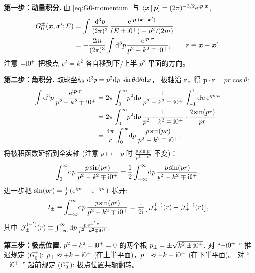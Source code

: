 \begin{proof*}
\textbf{第一步：动量积分.}
由 \eqref{eq:G0-momentum} 与 $\left\langle \bm x \,\middle|\, \bm p \right\rangle=(2\pi)^{-3/2}\mathrm{e}^{\mathrm{i}\bm p\cdot\bm x}$,
\begin{align}
  G_0^\pm(\bm x,\bm x';E)
  &= \int\frac{\mathrm{d}^3 p}{(2\pi)^3}\,
     \frac{\mathrm{e}^{\mathrm{i}\bm p\cdot(\bm x-\bm x')}}{(E\pm\mathrm{i} 0^+)-p^2/(2m)}\notag\\
  &= -\frac{2m}{(2\pi)^3}\int\mathrm{d}^3 p\,
     \frac{\mathrm{e}^{\mathrm{i}\bm p\cdot\bm r}}{p^2 - k^2\mp\mathrm{i} 0^+},\qquad
  \bm r\equiv\bm x-\bm x'.\label{eq:G-free-3d-step1}
\end{align}
注意 $\mp\mathrm{i} 0^+$ 把极点 $p^2=k^2$ 各自移到下/上半 $p^2$-平面的方向。

\textbf{第二步：角积分.}
取球坐标 $\mathrm{d}^3 p=p^2\mathrm{d} p\,\sin\theta\mathrm{d}\theta\mathrm{d}\varphi$，
极轴沿 $\bm r$，得 $\bm p\cdot\bm r=pr\cos\theta$:
\begin{align}
  \int\mathrm{d}^3 p\,\frac{\mathrm{e}^{\mathrm{i}\bm p\cdot\bm r}}{p^2-k^2\mp\mathrm{i} 0^+}
  &= 2\pi\int_0^\infty\!p^2\mathrm{d} p\,
     \frac{1}{p^2-k^2\mp\mathrm{i} 0^+}
     \int_{-1}^{1}\mathrm{d} u\,\mathrm{e}^{\mathrm{i} pru}\notag\\
  &= 2\pi\int_0^\infty\!p^2\mathrm{d} p\,
     \frac{1}{p^2-k^2\mp\mathrm{i} 0^+}\cdot
     \frac{2\sin(pr)}{pr}\notag\\
  &= \frac{4\pi}{r}\int_0^\infty\!\mathrm{d} p\,
     \frac{p\sin(pr)}{p^2-k^2\mp\mathrm{i} 0^+}.
\end{align}
将被积函数延拓到全实轴 (注意 $p\mapsto -p$ 时 $\frac{p\sin pr}{p^2-k^2}$ 不变)：
\begin{equation}
  \int_0^\infty\!\mathrm{d} p\,\frac{p\sin(pr)}{p^2-k^2\mp\mathrm{i} 0^+}
  = \frac12\int_{-\infty}^{\infty}\!\mathrm{d} p\,\frac{p\sin(pr)}{p^2-k^2\mp\mathrm{i} 0^+}.
\end{equation}
进一步把 $\sin(pr)=\frac{1}{2\mathrm{i}}(\mathrm{e}^{\mathrm{i} pr}-\mathrm{e}^{-\mathrm{i} pr})$ 拆开:
\begin{equation}\label{eq:G-free-3d-step2}
  I_\pm \equiv \int_{-\infty}^\infty\!\mathrm{d} p\,\frac{p\sin(pr)}{p^2-k^2\mp\mathrm{i} 0^+}
  = \frac{1}{2\mathrm{i}}\bigl[\,\mathcal J_\pm^{(+)}(r) - \mathcal J_\pm^{(-)}(r)\bigr],
\end{equation}
其中
$\mathcal J_\pm^{(\pm')}(r)\equiv
\int_{-\infty}^\infty\mathrm{d} p\,\frac{p\,\mathrm{e}^{\pm'\mathrm{i} pr}}{p^2-k^2\mp\mathrm{i} 0^+}$.

\textbf{第三步：极点位置.}
$p^2-k^2\mp\mathrm{i} 0^+=0$ 的两个根
$p_\pm = \pm\sqrt{k^2\pm\mathrm{i} 0^+}$.
对 ``$+\mathrm{i} 0^+$ '' 推迟规定 ($G_0^+$):
$p_+\approx +k+\mathrm{i} 0^+$ (在上半平面)，$p_-\approx -k-\mathrm{i} 0^+$ (在下半平面)。
对 ``$-\mathrm{i} 0^+$ '' 超前规定 ($G_0^-$): 极点位置共轭翻转。


\end{proof*}
